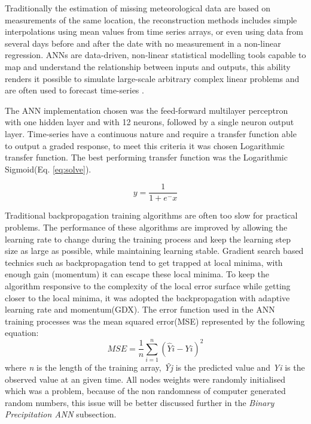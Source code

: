 Traditionally the estimation of missing meteorological data are based on measurements of the same location, the reconstruction methods includes simple interpolations using mean values from time series arrays, or even using data from several days before and after the date with no measurement in a non-linear regression\cite{kim2010reconstructing}. ANNs are data-driven, non-linear statistical modelling tools capable to map and understand the relationship  between inputs and outputs, this ability renders it possible to simulate large-scale arbitrary complex linear problems\cite{wu2006flood} and are often used to forecast time-series \cite{zhang2003time, box1976time, french1992rainfall, zhang1998linear}.

The ANN implementation chosen was the feed-forward multilayer perceptron with one hidden layer and with 12 neurons, followed by a single neuron output layer. Time-series have a continuous nature and require a transfer function able to output a graded response, to meet this criteria it was chosen Logarithmic transfer function. The best performing transfer function was the Logarithmic Sigmoid(Eq. \ref{eq:solve}).

\begin{equation}
\label{eq:solve}
y = \frac{1}{1 + e^-x}
\end{equation}

Traditional backpropagation training algorithms are often too slow for practical problems. The performance of these algorithms are improved by allowing the learning rate to change during the training process and keep the learning step size as large as possible, while maintaining learning stable. Gradient search based technics such as backpropagation tend to get trapped at local minima, with enough gain (momentum) it can escape these local minima\cite{montana1989training}. To keep the algorithm responsive to the complexity of the local error surface while getting closer to the local minima, it was adopted the backpropagation with adaptive learning rate and momentum(GDX). The error function used in the ANN training processes was the mean squared error(MSE) represented by the following equation:
\begin{equation}
\label{eq:solve2}
MSE = \frac{1}{n} \sum\limits_{i=1}^n (\hat{Y}i - Yi)^2
\end{equation}
where \textit{n} is the length of the training array, \textit{\^{Y}}\textit{j} is the predicted value and \textit{Yi} is the observed value at an given time. 
All nodes weights were randomly initialised which was a problem, because of the non randomness of computer generated random numbers, this issue will be better
discussed further in the \textit{Binary Precipitation ANN} subsection. 

